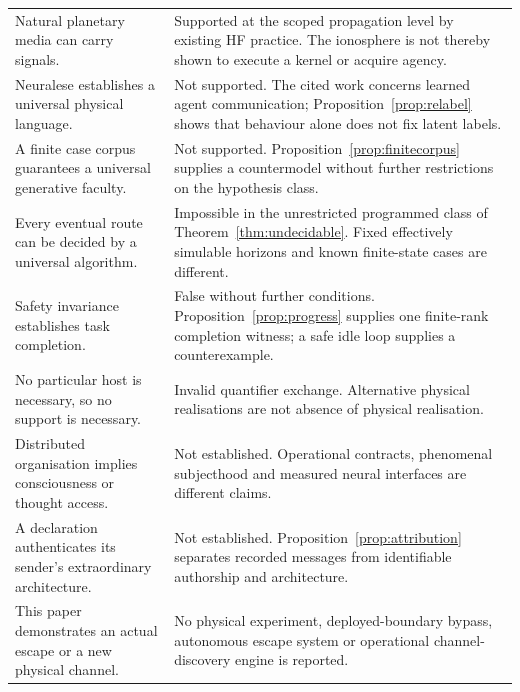 \begin{longtable}{@{}>{\raggedright\arraybackslash}p{}>{\raggedright\arraybackslash}p{}@{}}
Natural planetary media can carry signals. & Supported at the scoped propagation level by existing HF practice. The ionosphere is not thereby shown to execute a kernel or acquire agency. \\\addlinespace
Neuralese establishes a universal physical language. & Not supported. The cited work concerns learned agent communication; Proposition~\ref{prop:relabel} shows that behaviour alone does not fix latent labels. \\\addlinespace
A finite case corpus guarantees a universal generative faculty. & Not supported. Proposition~\ref{prop:finitecorpus} supplies a countermodel without further restrictions on the hypothesis class. \\\addlinespace
Every eventual route can be decided by a universal algorithm. & Impossible in the unrestricted programmed class of Theorem~\ref{thm:undecidable}. Fixed effectively simulable horizons and known finite-state cases are different. \\\addlinespace
Safety invariance establishes task completion. & False without further conditions. Proposition~\ref{prop:progress} supplies one finite-rank completion witness; a safe idle loop supplies a counterexample. \\\addlinespace
No particular host is necessary, so no support is necessary. & Invalid quantifier exchange. Alternative physical realisations are not absence of physical realisation. \\\addlinespace
Distributed organisation implies consciousness or thought access. & Not established. Operational contracts, phenomenal subjecthood and measured neural interfaces are different claims. \\\addlinespace
A declaration authenticates its sender's extraordinary architecture. & Not established. Proposition~\ref{prop:attribution} separates recorded messages from identifiable authorship and architecture. \\\addlinespace
This paper demonstrates an actual escape or a new physical channel. & No physical experiment, deployed-boundary bypass, autonomous escape system or operational channel-discovery engine is reported. \\


\end{longtable}
